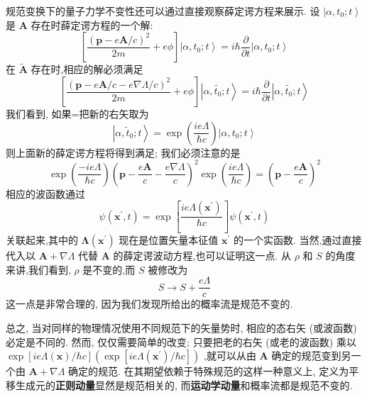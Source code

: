 规范变换下的量子力学不变性还可以通过直接观察薛定谔方程来展示. 设 $\left| {\alpha ,{t}_{0};t}\right\rangle$ 是 $\mathbf{A}$ 存在时薛定谔方程的一个解:
\begin{equation}
\left\lbrack {\frac{{\left( \mathbf{p} - e\mathbf{A}/c\right) }^{2}}{2m} + {e\phi }}\right\rbrack \left| {\alpha ,{t}_{0};t}\right\rangle = i\hbar \frac{\partial }{\partial t}\left| {\alpha ,{t}_{0};t}\right\rangle
\end{equation}
在 $\widetilde{\mathbf{A}}$ 存在时,相应的解必须满足
\begin{equation}
\left\lbrack {\frac{{\left( \mathbf{p} - e\mathbf{A}/c - e\nabla \Lambda /c\right) }^{2}}{2m} + {e\phi }}\right\rbrack \left| {\alpha ,\widetilde{{t}_{0}};t}\right\rangle = i\hbar \frac{\partial }{\partial t}\left| {\alpha ,\widetilde{{t}_{0}};t}\right\rangle
\end{equation}
我们看到, 如果=把新的右矢取为
\begin{equation}
\left| {\alpha ,{\widetilde{t}}_{0};t}\right\rangle = \exp \left( \frac{ie\Lambda }{\hbar c}\right) \left| {\alpha ,{t}_{0};t}\right\rangle
\end{equation}
则上面新的薛定谔方程将得到满足; 我们必须注意的是
\begin{equation}
\exp \left( \frac{-{ie\Lambda }}{\hbar c}\right) {\left( \mathbf{p} - \frac{e\mathbf{A}}{c} - \frac{e\nabla \Lambda }{c}\right) }^{2}\exp \left( \frac{ie\Lambda }{\hbar c}\right) = {\left( \mathbf{p} - \frac{e\mathbf{A}}{c}\right) }^{2}
\end{equation}
相应的波函数通过
\begin{equation}
\psi \left( {{\mathbf{x}}^{\prime }, t}\right) = \exp \left\lbrack \frac{{ie\Lambda }\left( {\mathbf{x}}^{\prime }\right) }{\hbar c}\right\rbrack \psi \left( {{\mathbf{x}}^{\prime }, t}\right)
\end{equation}
关联起来,其中的 $\mathbf{\Lambda }\left( {\mathbf{x}}^{\prime }\right)$ 现在是位置矢量本征值 ${\mathbf{x}}^{\prime }$ 的一个实函数. 当然,通过直接代入以 $\mathbf{A} + \nabla \Lambda$ 代替 $\mathbf{A}$ 的薛定谔波动方程,也可以证明这一点. 从 $\rho$ 和 $S$ 的角度来讲,我们看到, $\rho$ 是不变的,而 $S$ 被修改为
\begin{equation}
S \rightarrow S + \frac{e\Lambda }{c}
\end{equation}
这一点是非常合理的, 因为我们发现所给出的概率流是规范不变的.

总之, 当对同样的物理情况使用不同规范下的矢量势时, 相应的态右矢 (或波函数) 必定是不同的. 然而, 仅仅需要简单的改变; 只要把老的右矢 (或老的波函数) 乘以 $\exp \left\lbrack {{ie\Lambda }\left( \mathbf{x}\right) /\hbar c}\right\rbrack \left( {\exp \left\lbrack {{ie\Lambda }\left( {\mathbf{x}}^{\prime }\right) /\hbar c}\right\rbrack }\right)$ ,就可以从由 $\mathbf{A}$ 确定的规范变到另一个由 $\mathbf{A} + \nabla \Lambda$ 确定的规范. 在其期望依赖于特殊规范的这样一种意义上, 定义为平移生成元的\textbf{正则动量}显然是规范相关的, 而\textbf{运动学动量}和概率流都是规范不变的.

